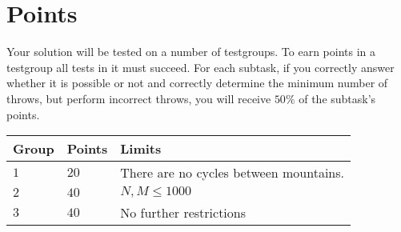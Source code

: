 \section*{Points}
\noindent
Your solution will be tested on a number of testgroups.
To earn points in a testgroup all tests in it must succeed.
For each subtask, if you correctly answer whether it is possible or not and correctly determine the minimum number of throws, but perform incorrect throws,
you will receive $50\%$ of the subtask's points.

\noindent
\begin{tabular}{| l | l | l |}
\hline
  Group & Points & Limits \\ \hline
  $1$    & $20$       &  There are no cycles between mountains.\\ \hline 
  $2$    & $40$       &  $N, M \leq 1000$ \\ \hline
  $3$    & $40$       &  No further restrictions \\ \hline
\end{tabular}
